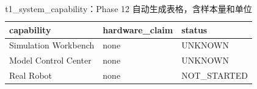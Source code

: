 \begin{table}[htbp]
\centering
\caption{t1_system_capability：Phase 12 自动生成表格，含样本量和单位}
\begin{tabular}{lll}
\hline
capability & hardware_claim & status \\
\hline
Simulation Workbench & none & UNKNOWN \\
Model Control Center & none & UNKNOWN \\
Real Robot & none & NOT\_STARTED \\
\hline
\end{tabular}
\end{table}
